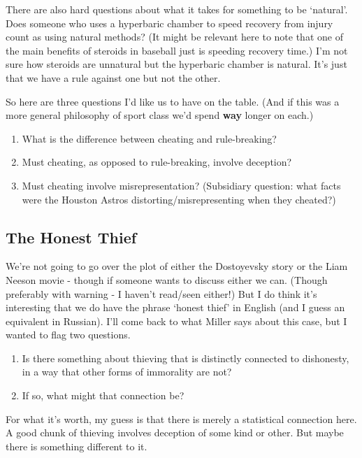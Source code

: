 \documentclass[
]{article}
\providecommand{\tightlist}{%
  \setlength{\itemsep}{0pt}\setlength{\parskip}{0pt}}
\begin{document}
There are also hard questions about what it takes for something to be
`natural'. Does someone who uses a hyperbaric chamber to speed recovery
from injury count as using natural methods? (It might be relevant here
to note that one of the main benefits of steroids in baseball just is
speeding recovery time.) I'm not sure how steroids are unnatural but the
hyperbaric chamber is natural. It's just that we have a rule against one
but not the other.

So here are three questions I'd like us to have on the table. (And if
this was a more general philosophy of sport class we'd spend
\textbf{way} longer on each.)

\begin{enumerate}
\def\labelenumi{\arabic{enumi}.}
\tightlist
\item
  What is the difference between cheating and rule-breaking?
\item
  Must cheating, as opposed to rule-breaking, involve deception?
\item
  Must cheating involve misrepresentation? (Subsidiary question: what
  facts were the Houston Astros distorting/misrepresenting when they
  cheated?)
\end{enumerate}

\hypertarget{the-honest-thief}{%
\subsection{The Honest Thief}\label{the-honest-thief}}

We're not going to go over the plot of either the Dostoyevsky story or
the Liam Neeson movie - though if someone wants to discuss either we
can. (Though preferably with warning - I haven't read/seen either!) But
I do think it's interesting that we do have the phrase `honest thief' in
English (and I guess an equivalent in Russian). I'll come back to what
Miller says about this case, but I wanted to flag two questions.

\begin{enumerate}
\def\labelenumi{\arabic{enumi}.}
\tightlist
\item
  Is there something about thieving that is distinctly connected to
  dishonesty, in a way that other forms of immorality are not?
\item
  If so, what might that connection be?
\end{enumerate}

For what it's worth, my guess is that there is merely a statistical
connection here. A good chunk of thieving involves deception of some
kind or other. But maybe there is something different to it.
\end{document}
